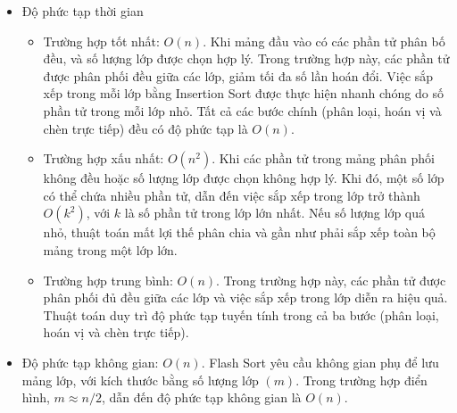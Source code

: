 \begin{itemize}
	\item Độ phức tạp thời gian 
	\begin{itemize}[label=$\circ$]
		\item Trường hợp tốt nhất: $O\left(n\right)$. Khi mảng đầu vào có các phần tử 
		phân bố đều, và số lượng lớp được chọn hợp lý. Trong trường hợp 
		này, các phần tử được phân phối đều giữa các lớp, giảm tối đa số 
		lần hoán đổi. Việc sắp xếp trong mỗi lớp bằng Insertion Sort được 
		thực hiện nhanh chóng do số phần tử trong mỗi lớp nhỏ. Tất cả các 
		bước chính (phân loại, hoán vị và chèn trực tiếp) đều có độ phức 
		tạp là $O\left(n\right)$.
		\item Trường hợp xấu nhất: $O\left(n^2\right)$. Khi các phần tử trong mảng phân 
		phối không đều hoặc số lượng lớp được chọn không hợp lý. Khi đó, một 
		số lớp có thể chứa nhiều phần tử, dẫn đến việc sắp xếp trong lớp trở 
		thành $O\left(k^2\right)$, với $k$ là số phần tử trong lớp lớn nhất. Nếu số lượng 
		lớp quá nhỏ, thuật toán mất lợi thế phân chia và gần như phải sắp xếp 
		toàn bộ mảng trong một lớp lớn.
		\item Trường hợp trung bình: $O\left(n\right)$. Trong trường hợp này, các phần 
		tử được phân phối đủ đều giữa các lớp và việc sắp xếp trong lớp 
		diễn ra hiệu quả. Thuật toán duy trì độ phức tạp tuyến tính trong 
		cả ba bước (phân loại, hoán vị và chèn trực tiếp).
	\end{itemize}
	
	\item Độ phức tạp không gian: $O\left(n\right)$. Flash Sort yêu cầu không gian 
	phụ để lưu mảng lớp, với kích thước bằng số lượng lớp $(m)$. Trong 
	trường hợp điển hình, $m \approx n/2$, dẫn đến độ phức tạp không gian 
	là $O\left(n\right)$.
\end{itemize}